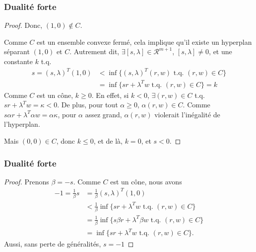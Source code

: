\documentclass[usepdftitle=false]{beamer}
\def\cR{\mathcal{R}}
\begin{document}
\begin{frame}
\frametitle{Dualité forte}

\begin{proof}
Donc, $(1,0) \notin C$.

\mbox{}

Comme $C$ est un ensemble convexe fermé, cela implique qu'il existe un hyperplan séparant $(1,0)$ et $C$. Autrement dit, $\exists [s, \lambda] \in \cR^{m+1}$, $[s, \lambda] \ne 0$, et une constante $k$ t.q.
\begin{align*}
s = (s, \lambda)^T (1,0) &< \inf \lbrace (s, \lambda)^T(r,w) \mbox{ t.q. } (r,w) \in C \rbrace \\
& = \inf \lbrace sr + \lambda^Tw \mbox{ t.q. } (r,w) \in C \rbrace = k
\end{align*}
Comme $C$ est un cône, $k \geq 0$. En effet, si $k < 0$, $\exists (r,w) \in C$ t.q. $sr + \lambda^T w = \kappa < 0$.
De plus, pour tout $\alpha \geq 0$, $\alpha (r,w) \in C$. Comme $s \alpha r + \lambda^T  \alpha w = \alpha\kappa$, pour $\alpha$ assez grand, $\alpha (r,w)$ violerait l'inégalité de l'hyperplan.

\mbox{}

Mais $(0,0) \in C$, donc $k \leq 0$, et de là, $k = 0$, et $s < 0$.
\end{proof}

\end{frame}

\begin{frame}
\frametitle{Dualité forte}

\begin{proof}
Prenons $\beta = -s$. Comme $C$ est un cône, nous avons
\begin{align*}
-1 = \frac{1}{\beta}s &= \frac{1}{\beta}(s,\lambda)^T(1,0) \\
&< \frac{1}{\beta}\inf \lbrace sr + \lambda^Tw \mbox{ t.q. } (r,w) \in C \rbrace \\
&= \frac{1}{\beta}\inf \lbrace s\beta r + \lambda^T \beta w \mbox{ t.q. } (r,w) \in C \rbrace \\
&= \inf \lbrace s r + \lambda^T w \mbox{ t.q. } (r,w) \in C \rbrace.
\end{align*}
Aussi, sans perte de généralités, $s = -1$

\end{proof}

\end{frame}
\end{document}
